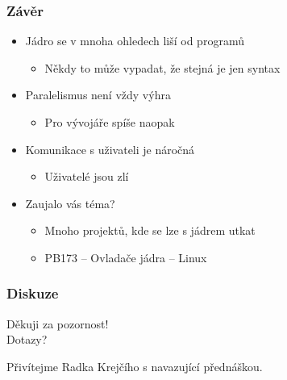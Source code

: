\documentclass[xcolor=dvipsnames]{beamer}
\begin{document}
\begin{frame}
  \frametitle{Závěr}
  \begin{itemize}
  \item Jádro se v mnoha ohledech liší od programů
  \begin{itemize}
  \item Někdy to může vypadat, že stejná je jen syntax
  \end{itemize}
  \item Paralelismus není vždy výhra
  \begin{itemize}
  \item Pro vývojáře spíše naopak
  \end{itemize}
  \item Komunikace s uživateli je náročná
  \begin{itemize}
  \item Uživatelé jsou zlí
  \end{itemize}
  \end{itemize}

  \pause
  \medskip

  \begin{itemize}
  \item Zaujalo vás téma?
  \begin{itemize}
  \item Mnoho projektů, kde se lze s jádrem utkat
  \item PB173 -- Ovladače jádra -- Linux
  \end{itemize}
  \end{itemize}

\end{frame}

\begin{frame}
  \frametitle{Diskuze}
  \begin{center} \huge
  Děkuji za pozornost! \\[1.8em]
  Dotazy?
  \end{center}

  \pause
  \bigskip

  \begin{center} \large
  Přivítejme Radka Krejčího s navazující přednáškou.
  \end{center}
\end{frame}
\end{document}
